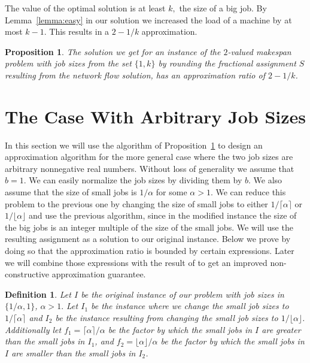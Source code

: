 \documentclass[11pt]{article}\usepackage{amsmath}
\newtheorem{definition}{Definition}[section]
\newtheorem{proposition}{Proposition}[section]
\begin{document}
The value of the optimal solution is at least $k,$
the size of a big job. By Lemma~\ref{lemma:easy} 
in our solution we increased the load of a
machine by at most $k-1.$ This results in a $2-1/k$ approximation.

\begin{proposition} \label{propos}
The solution we get for an instance of the $2$-valued makespan problem
with job  sizes from the  set $\{ 1,k \}$ by rounding  the fractional
assignment  $S$  resulting from  the  network  flow  solution, has  an
approximation ratio of $2-1/k$.
\end{proposition}








\section{The Case With Arbitrary Job Sizes } \label{sec:int}

In this section we will use the algorithm of Proposition~\ref{propos}  to
design an approximation algorithm for  the more general case where the
two job sizes are arbitrary  nonnegative real numbers. Without loss of
generality we assume that $b=1$. We can easily normalize the job sizes
by dividing them by $b$. We also assume that the size of small jobs is
$1/\alpha $ for  some $\alpha > 1$. We can reduce  this problem to the
previous one  by changing the size  of small jobs  to either $1/\lceil
\alpha  \rceil$ or  $1/\lfloor \alpha  \rfloor$ and  use  the previous
algorithm, since  in the modified instance 
the size of the big  jobs is an integer  multiple of the
size of the small jobs. We will use the resulting assignment as a solution
to  our  original  instance. Below  we  prove  by  doing so  that  the
approximation ratio  is bounded by certain expressions.  Later we will
combine those expressions with the result of \cite{svensson} to get an
improved non-constructive approximation guarantee.

\begin{definition}
Let $I$ be the 
 original instance of our problem with job sizes in $\{1/\alpha ,1
 \}$, $\alpha > 1.$ Let $I_1$ be the instance where we change the small job sizes to $1/\lceil \alpha  \rceil $ and $I_2$ be the instance resulting from changing the small job sizes to $1/\lfloor \alpha  \rfloor$. Additionally let $f_1=\lceil \alpha  \rceil /\alpha  $ be the factor by which the small jobs in $I$ are greater than the small  jobs in $I_1$, and $f_2=\lfloor \alpha  \rfloor /\alpha $ be the factor by which the small jobs in $I$ are smaller than the small jobs in $I_2$.
\end{definition}
\end{document}
